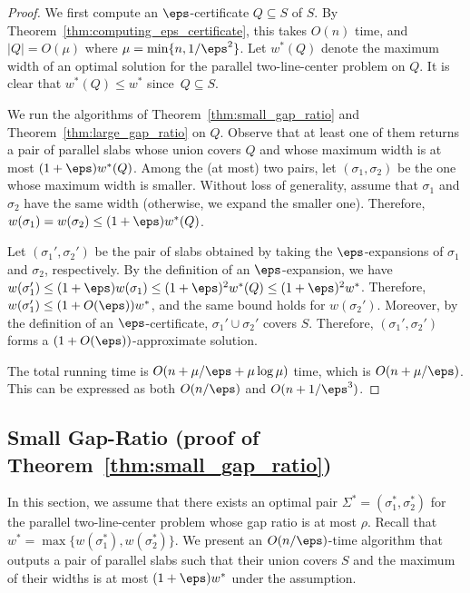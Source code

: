 \begin{proof}
    We first compute an $\eps$-certificate $Q\subseteq S$ of $S$. 
By Theorem~\ref{thm:computing_eps_certificate}, this takes $O(n)$ time, and $|Q| = O(\mu)$ where $\mu = \min \{n, 1/\eps^2\}$. 
Let $w^*(Q)$ denote the maximum width of an optimal solution for the parallel two-line-center problem on $Q$. It is clear that $w^*(Q) \le w^*$ since~$Q\subseteq S$. 

We run the algorithms of Theorem~\ref{thm:small_gap_ratio} and Theorem~\ref{thm:large_gap_ratio} on $Q$. 
Observe that at least one of them returns a pair of parallel slabs whose union covers $Q$ and whose maximum width is at most $(1+\eps)w^*(Q)$.
Among the (at most) two pairs, let $(\sigma_1, \sigma_2)$ be the one whose maximum width is smaller.
Without loss of generality, assume that $\sigma_1$ and $\sigma_2$ have the same width (otherwise, we expand the smaller one). Therefore, $w(\sigma_1) = w(\sigma_2) \le (1+\eps)w^*(Q)$.

Let $(\sigma_1', \sigma_2')$ be the pair of slabs obtained by taking the $\eps$-expansions of $\sigma_1$ and $\sigma_2$, respectively.  
By the definition of an $\eps$-expansion, we have $w(\sigma_1') \le (1+\eps)w(\sigma_1) \le (1+\eps)^2w^*(Q) \le (1+\eps)^2w^*$. 
Therefore, $w(\sigma_1')\le (1+O(\eps)) w^*$, and the same bound holds for $w(\sigma_2')$.
Moreover, by the definition of an $\eps$-certificate, $\sigma_1' \cup \sigma_2'$ covers $S$.  
Therefore, $(\sigma_1', \sigma_2')$ forms a $(1+O(\eps))$-approximate solution.

The total running time is $O(n + \mu/\eps + \mu \log \mu)$ time, which is $O(n + \mu /\eps)$. 
This can be expressed as both $O(n/\eps)$ and $O(n + 1/\eps^3)$.
\end{proof}





\subsection{Small Gap-Ratio (proof of Theorem~\ref{thm:small_gap_ratio})}
\label{sec:small_gap_ratio}
In this section, we assume that there exists an optimal pair $\Sigma^* = (\sigma_1^*, \sigma_2^*)$ for the parallel two-line-center problem whose gap ratio is at most $\rho$. 
Recall that $w^* = \max \{w(\sigma_1^*), w(\sigma_2^*) \}$.
We present an $O(n/\eps)$-time algorithm that outputs a pair of parallel slabs such that their union covers $S$ and the maximum of their widths is at most $(1+\eps)w^*$ under the assumption.


